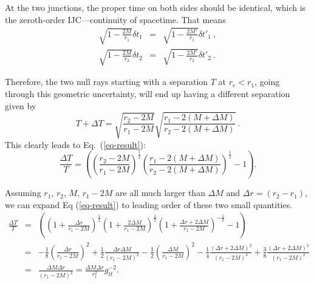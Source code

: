 \documentclass[aps,showpacs,onecolumn,floats,prd,superscriptaddress,nofootinbib]{revtex4-1}
\begin{document}
At the two junctions, the proper time on both sides should be identical, which is the zeroth-order IJC---continuity of spacetime.
That means
\begin{eqnarray}
	\sqrt{1-\frac{2M}{r_1}} \delta t_1 &=& \sqrt{1-\frac{2M'}{r_1}} \delta t'_1~, \\
         \sqrt{1-\frac{2M}{r_2}} \delta t_2 &=& \sqrt{1-\frac{2M'}{r_2}} \delta t'_2~.
\end{eqnarray}

Therefore, the two null rays starting with a separation $T$ at $r_e<r_1$, going through this geometric uncertainty, will end up having a different separation given by
\begin{equation}
T+\Delta T = \sqrt{\frac{r_2-2M}{r_1-2M}} \sqrt{\frac{r_1-2(M+\Delta M)}{r_2-2(M+\Delta M)}}~.
\end{equation}
This clearly leads to Eq.~(\ref{eq-result}):
\begin{equation}
	\frac{\Delta T}{T} 
	= \left( \left( \frac{r_2 - 2M}{r_1 - 2M} \right)^\frac{1}{2} \left( \frac{r_1 - 2(M+\Delta M)}{r_2 - 2(M+\Delta M)} \right)^\frac{1}{2} - 1\right).	\label{10}
\end{equation}

Assuming $r_1$, $r_2$, $M$, $r_1-2M$ are all much larger than $\Delta M$ and $\Delta r=(r_2-r_1)$, we can expand Eq (\ref{eq-result}) to leading order of these two small quantities.
\begin{eqnarray}
	\frac{\Delta T}{T} & = & 
	\left( \left( 1+ \frac{\Delta r}{r_1 - 2M} \right)^\frac{1}{2} \left( 1 + \frac{2\Delta M}{r_1 - 2M} \right)^\frac{1}{2} \left( 1 + \frac{\Delta r + 2 \Delta M}{r_1 - 2M} \right)^{-\frac{1}{2}} - 1 \right)	\nonumber	\\
	& = & - \frac{1}{8} \left( \frac{\Delta r}{r_1 - 2M} \right)^2 + 
	\frac{1}{2} \frac{\Delta r \Delta M}{(r_1 - 2M)^2} - 
	\frac{1}{2} \left( \frac{\Delta M}{r_1 - 2M} \right)^2 - 
	\frac{1}{4} \frac{( \Delta r + 2 \Delta M)^2}{(r_1 - 2M)^2} + 
	\frac{3}{8} \frac{(\Delta r+ 2 \Delta M)^2}{(r_1 - 2M)^2} 	\nonumber	\\
	& = & \frac{\Delta M \Delta r}{(r_1 - 2M)^2} = \frac{\Delta M \Delta r}{r_1^2} g_{tt}^{-2}.
\end{eqnarray}
	
\end{document}
